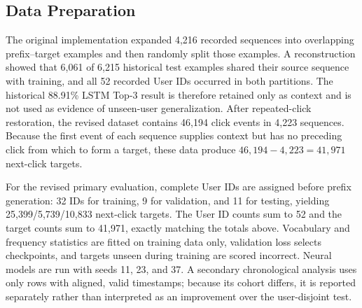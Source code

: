 \documentclass[sn-mathphys-num, Numbered]{sn-jnl}%
\theoremstyle{thmstyleone}%
\theoremstyle{thmstyletwo}%
\theoremstyle{thmstylethree}%
\begin{document}
\subsection{Data Preparation}
The original implementation expanded 4,216 recorded sequences into overlapping prefix--target examples and then randomly split those examples. A reconstruction showed that 6,061 of 6,215 historical test examples shared their source sequence with training, and all 52 recorded User IDs occurred in both partitions. The historical 88.91\% LSTM Top-3 result is therefore retained only as context and is not used as evidence of unseen-user generalization. After repeated-click restoration, the revised dataset contains 46,194 click events in 4,223 sequences. Because the first event of each sequence supplies context but has no preceding click from which to form a target, these data produce $46{,}194-4{,}223=41{,}971$ next-click targets.

For the revised primary evaluation, complete User IDs are assigned before prefix generation: 32 IDs for training, 9 for validation, and 11 for testing, yielding 25,399/5,739/10,833 next-click targets. The User ID counts sum to 52 and the target counts sum to 41,971, exactly matching the totals above. Vocabulary and frequency statistics are fitted on training data only, validation loss selects checkpoints, and targets unseen during training are scored incorrect. Neural models are run with seeds 11, 23, and 37. A secondary chronological analysis uses only rows with aligned, valid timestamps; because its cohort differs, it is reported separately rather than interpreted as an improvement over the user-disjoint test.
\end{document}
